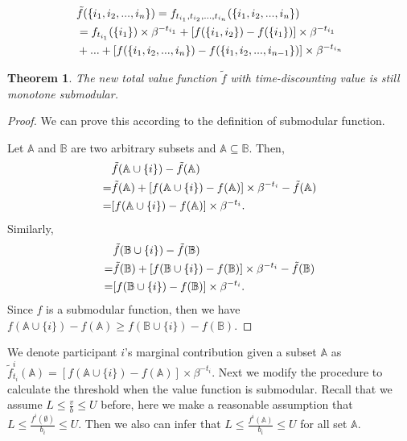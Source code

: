 \documentclass[10pt,journal,letterpaper,compsoc]{IEEEtran}
\newtheorem{theorem}{Theorem}
\begin{document}
\begin{align}
&\tilde{f}(\{i_1,i_2,...,i_n\}) = f_{t_{i_1},t_{i_2},...,t_{i_n}}(\{i_1,i_2,...,i_n\}) \notag \\
&=f_{t_{i_1}}(\{i_1\})\times \beta^{-t_{i_1}} + [f(\{i_1,i_2\})-f(\{i_1\})]\times\beta^{-t_{i_1}} \notag\\
&+... +[f(\{i_1,i_2,...,i_{n}\})-f(\{i_1,i_2,...,i_{n-1}\})]\times\beta^{-t_{i_n}} 
\end{align}

\begin{theorem}
The new total value function $\tilde{f}$ with time-discounting value is still monotone submodular.
\end{theorem}
\begin{proof}
We can prove this according to the definition of submodular function.

Let $\mathbb{A}$ and $\mathbb{B}$ are two arbitrary subsets and $\mathbb{A}\subseteq\mathbb{B}$. Then,
\begin{align}
&\tilde{f}(\mathbb{A}\cup\{i\}) - \tilde{f}(\mathbb{A})\notag\\ 
 = &\tilde{f}(\mathbb{A}) + [f(\mathbb{A}\cup\{i\})-f(\mathbb{A})] \times\beta^{-t_i} - \tilde{f}(\mathbb{A}) \notag\\
= &[f(\mathbb{A}\cup\{i\})-f(\mathbb{A})] \times\beta^{-t_i}. \notag
\end{align}
Similarly,
\begin{align}
&\tilde{f}(\mathbb{B}\cup\{i\}) - \tilde{f}(\mathbb{B})  \notag \\
= &\tilde{f}(\mathbb{B}) + [f(\mathbb{B}\cup\{i\})-f(\mathbb{B})] \times\beta^{-t_i} - \tilde{f}(\mathbb{B}) \notag\\
= &[f(\mathbb{B}\cup\{i\})-f(\mathbb{B})] \times\beta^{-t_i}. \notag
\end{align}
Since $f$ is a submodular function, then we have $f(\mathbb{A}\cup\{i\})-f(\mathbb{A})\ge f(\mathbb{B}\cup\{i\})-f(\mathbb{B}) $.
\end{proof}

We denote participant $i$'s marginal contribution given a subset $\mathbb{A}$ as
 $\tilde{f}^i_{t_i}(\mathbb{A}) = [f(\mathbb{A}\cup\{i\}) - f(\mathbb{A})]\times \beta^{-t_i}$.
Next we modify the procedure to calculate the threshold when the value function is submodular. Recall that we assume $L\le\frac{v}{b}\le U$ before, here we make a reasonable assumption that $L\le\frac{f^i(\emptyset)}{b_i}\le U$. Then we also can infer that $L\le\frac{f^i(\mathbb{A})}{b_i}\le U$ for all set $\mathbb{A}$.
\end{document}
